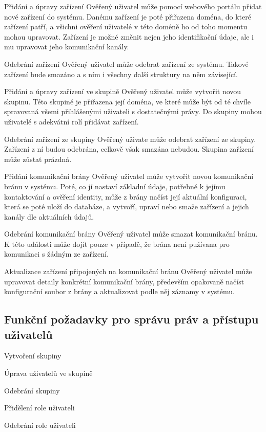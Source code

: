 \begin{enumfunctional}[style=nextline]
\item[Přidání a úpravy zařízení]
Ověřený uživatel může pomocí webového portálu přidat nové zařízení do systému. Danému zařízení je poté přiřazena doména, do které zařízení patří, a všichni ověření uživatelé v této doméně ho od toho momentu mohou upravovat. Zařízení je možné změnit nejen jeho identifikační údaje, ale i mu upravovat jeho komunikační kanály.
\item[Odebrání zařízení]
Ověřený uživatel může odebrat zařízení ze systému. Takové zařízení bude smazáno a s ním i všechny další struktury na něm závisející.
\item[Přidání a úpravy zařízení ve skupině]
Ověřený uživatel může vytvořit novou skupinu. Této skupině je přiřazena její doména, ve které může být od té chvíle spravovaná všemi přihlášenými uživateli s dostatečnými právy. Do skupiny mohou uživatelé s adekvátní rolí přidávat zařízení.
\item[Odebrání zařízení ze skupiny]
Ověřený uživate může odebrat zařízení ze skupiny. Zařízení z ní budou odebrána, celkově však smazána nebudou. Skupina zařízení může zůstat prázdná.
\item[Přidání komunikační brány]
Ověřený uživatel může vytvořit novou komunikační bránu v systému. Poté, co jí nastaví základní údaje, potřebné k jejímu kontaktování a ověření identity, může z brány načíst její aktuální konfiguraci, která se poté uloží do databáze, a vytvoří, upraví nebo smaže zařízení a jejich kanály dle aktuálních údajů.
\item[Odebrání komunikační brány]
Ověřený uživatel může smazat komunikační bránu. K této události může dojít pouze v případě, že brána není pužívana pro komunikaci s žádným ze zařízení.
\item[Aktualizace zařízení připojených na komunikační bránu]
Ověřený uživatel může upravovat detaily konkrétní komunikační brány, především opakovaně načíst konfigurační soubor z brány a aktualizovat podle něj záznamy v systému.

\subsection{Funkční požadavky pro správu práv a přístupu uživatelů}

\item[Vytvoření skupiny]
\item[Úprava uživatelů ve skupině]
\item[Odebrání skupiny]
\item[Přidělení role uživateli]
\item[Odebrání role uživateli]
\end{enumfunctional}

